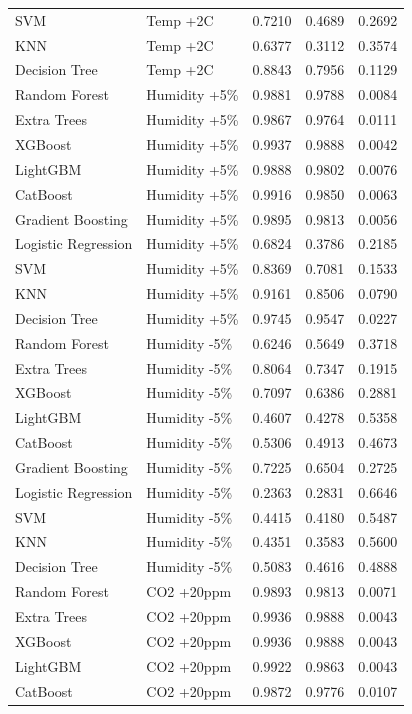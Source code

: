\begin{tabular}{llrrr}
SVM & Temp +2C & 0.7210 & 0.4689 & 0.2692 \\
KNN & Temp +2C & 0.6377 & 0.3112 & 0.3574 \\
Decision Tree & Temp +2C & 0.8843 & 0.7956 & 0.1129 \\
Random Forest & Humidity +5\% & 0.9881 & 0.9788 & 0.0084 \\
Extra Trees & Humidity +5\% & 0.9867 & 0.9764 & 0.0111 \\
XGBoost & Humidity +5\% & 0.9937 & 0.9888 & 0.0042 \\
LightGBM & Humidity +5\% & 0.9888 & 0.9802 & 0.0076 \\
CatBoost & Humidity +5\% & 0.9916 & 0.9850 & 0.0063 \\
Gradient Boosting & Humidity +5\% & 0.9895 & 0.9813 & 0.0056 \\
Logistic Regression & Humidity +5\% & 0.6824 & 0.3786 & 0.2185 \\
SVM & Humidity +5\% & 0.8369 & 0.7081 & 0.1533 \\
KNN & Humidity +5\% & 0.9161 & 0.8506 & 0.0790 \\
Decision Tree & Humidity +5\% & 0.9745 & 0.9547 & 0.0227 \\
Random Forest & Humidity -5\% & 0.6246 & 0.5649 & 0.3718 \\
Extra Trees & Humidity -5\% & 0.8064 & 0.7347 & 0.1915 \\
XGBoost & Humidity -5\% & 0.7097 & 0.6386 & 0.2881 \\
LightGBM & Humidity -5\% & 0.4607 & 0.4278 & 0.5358 \\
CatBoost & Humidity -5\% & 0.5306 & 0.4913 & 0.4673 \\
Gradient Boosting & Humidity -5\% & 0.7225 & 0.6504 & 0.2725 \\
Logistic Regression & Humidity -5\% & 0.2363 & 0.2831 & 0.6646 \\
SVM & Humidity -5\% & 0.4415 & 0.4180 & 0.5487 \\
KNN & Humidity -5\% & 0.4351 & 0.3583 & 0.5600 \\
Decision Tree & Humidity -5\% & 0.5083 & 0.4616 & 0.4888 \\
Random Forest & CO2 +20ppm & 0.9893 & 0.9813 & 0.0071 \\
Extra Trees & CO2 +20ppm & 0.9936 & 0.9888 & 0.0043 \\
XGBoost & CO2 +20ppm & 0.9936 & 0.9888 & 0.0043 \\
LightGBM & CO2 +20ppm & 0.9922 & 0.9863 & 0.0043 \\
CatBoost & CO2 +20ppm & 0.9872 & 0.9776 & 0.0107 \\

\end{tabular}
